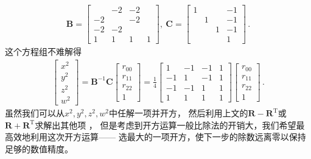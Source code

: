 \begin{align}
    \bm B=\left[\begin{array}{rrrr}
               & -2 & -2 &   \\
            -2 &    & -2 &   \\
            -2 & -2 &    &   \\
            1  & 1  & 1  & 1
        \end{array}\right],\
    \bm C=\left[\begin{array}{rrrr}
            1 &   &   & -1 \\
              & 1 &   & -1 \\
              &   & 1 & -1 \\
              &   &   & 1
        \end{array}\right]\, .
\end{align}
这个方程组不难解得
\begin{align}\label{eq:02ex.2}
    \left[\begin{array}{c}
            x^2 \\y^2\\z^2\\w^2
        \end{array}\right]=\bm B^{-1}\bm C\left[\begin{array}{c}
            r_{00} \\r_{11}\\r_{22}\\1
        \end{array}\right]=\frac{1}{4}\left[\begin{array}{rrrr}
            1  & -1 & -1 & 1 \\
            -1 & 1  & -1 & 1 \\
            -1 & -1 & 1  & 1 \\
            1  & 1  & 1  & 1
        \end{array}\right]\left[\begin{array}{c}
            r_{00} \\r_{11}\\r_{22}\\1
        \end{array}\right]\, .
\end{align}
虽然我们可以从$x^2,y^2,z^2,w^2$中任解一项并开方，
然后利用上文的$\bm R-\bm R^\mathrm{T}$或$\bm R+\bm R^\mathrm{T}$求解出其他项
，
但是考虑到开方运算一般比除法的开销大，我们希望最高效地利用这次开方运算——
选最大的一项开方，使下一步的除数远离零以保持足够的数值精度。
